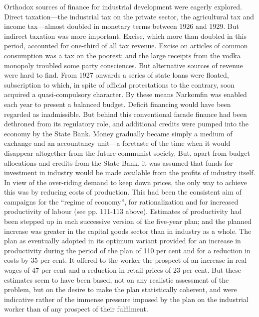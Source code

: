 Orthodox sources of finance for industrial development were eagerly explored. Direct taxation---the industrial tax on the private sector, the agricultural tax and income tax---almost doubled in monetary terms between 1926 and 1929. But indirect taxation was more important. Excise, which more than doubled in this period, accounted for one-third of all tax revenue. Excise on articles of common consumption was a tax on the poorest; and the large receipts from the vodka monopoly troubled some party consciences. But alternative sources of revenue were hard to find. From 1927 onwards a series of state loans were floated, subscription to which, in spite of official protestations to the contrary, soon acquired a quasi-compulsory character. By these means Narkomfin was enabled each year to present a balanced budget. Deficit financing would have been regarded as inadmissible. But behind this conventional facade finance had been dethroned from its regulatory role, and additional credits were pumped into the economy by the State Bank. Money gradually became simply a medium of exchange and an accountancy unit---a foretaste of the time when it would disappear altogether from the future communist society. But, apart from budget allocations and credits from the State Bank, it was assumed that funds for investment in industry would be made available from the profits of industry itself. In view of the over-riding demand to keep down prices, the only way to achieve this was by reducing costs of production. This had been the consistent aim of campaigns for the ``regime of economy'', for rationalization and for increased productivity of labour (see pp. 111-113 above). Estimates of productivity had been stepped up in each successive version of the five-year plan; and the planned increase was greater in the capital goods sector than in industry as a whole. The plan as eventually adopted in its optimum variant provided for an increase in productivity during the period of the plan of 110 per cent and for a reduction in costs by 35 per cent. It offered to the worker the prospect of an increase in real wages of 47 per cent and a reduction in retail prices of 23 per cent. But these estimates seem to have been based, not on any realistic assessment of the problem, but on the desire to make the plan statistically coherent, and were indicative rather of the immense pressure imposed by the plan on the industrial worker than of any prospect of their fulfilment. 

